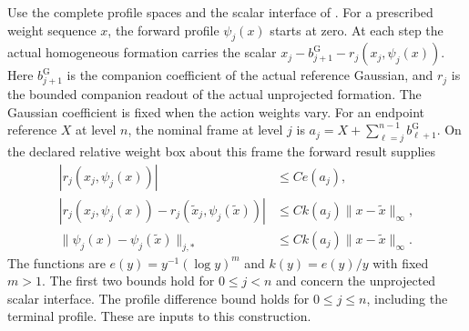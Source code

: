 \documentclass[11pt,letterpaper,reqno]{amsart}
\numberwithin{equation}{section}
\theoremstyle{definition}
\theoremstyle{remark}
\begin{document}
Use the complete profile spaces and the scalar interface of
\cite[Theorem B and Corollary~7.5]{EM}. For a prescribed weight
sequence $x$, the forward profile $\psi_j(x)$ starts at zero.
At each step the actual homogeneous formation carries the scalar
$x_j-b^{\mathrm G}_{j+1}-r_j(x_j,\psi_j(x))$. Here
$b^{\mathrm G}_{j+1}$ is the companion coefficient of the actual
reference Gaussian, and $r_j$ is the bounded companion readout of
the actual unprojected formation. The Gaussian coefficient is fixed
when the action weights vary. For an endpoint reference $X$ at level
$n$, the nominal frame at level $j$ is
$a_j=X+\sum_{\ell=j}^{n-1}b^{\mathrm G}_{\ell+1}$. On the declared
relative weight box about this frame the forward result supplies
\begin{equation}\label{rt:eq-homogeneous-interface}
 \begin{aligned}
 |r_j(x_j,\psi_j(x))|&\le C e(a_j),\\
 |r_j(x_j,\psi_j(x))-r_j(\widetilde x_j,\psi_j(\widetilde x))|
     &\le C k(a_j)\|x-\widetilde x\|_\infty,\\
 \|\psi_j(x)-\psi_j(\widetilde x)\|_{j,*}
     &\le C k(a_j)\|x-\widetilde x\|_\infty.
 \end{aligned}
\end{equation}
The functions are $e(y)=y^{-1}(\log y)^m$ and $k(y)=e(y)/y$
with fixed $m>1$. The first two bounds hold for $0\le j<n$ and
concern the unprojected scalar interface. The profile difference
bound holds for $0\le j\le n$, including the terminal profile.
These are inputs to this construction.
\end{document}
